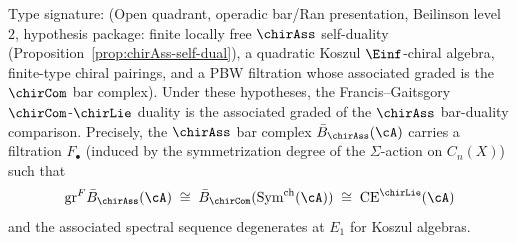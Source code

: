 \begin{theorem}\label{thm:fg-from-assch}
Type signature: \textup{(}Open quadrant, operadic bar/Ran
presentation, Beilinson level~$2$, hypothesis package: finite locally
free $\chirAss$ self-duality
\textup{(}Proposition~\ref{prop:chirAss-self-dual}\textup{)}, a
quadratic Koszul $\Einf$-chiral algebra, finite-type chiral pairings,
and a PBW filtration whose associated graded is the
$\chirCom$ bar complex\textup{)}.
Under these hypotheses, the Francis--Gaitsgory
$\chirCom$-$\chirLie$ duality is the associated graded of the
$\chirAss$ bar-duality comparison. Precisely, the $\chirAss$ bar
complex $\bar{B}_{\chirAss}(\cA)$ carries a filtration $F_\bullet$
\textup{(}induced by the symmetrization degree of the
$\Sigma$-action on $C_n(X)$\textup{)} such that
\begin{equation}\label{eq:fg-from-assch}
\mathrm{gr}^F \bar{B}_{\chirAss}(\cA) \;\cong\; \bar{B}_{\chirCom}(\mathrm{Sym}^{\mathrm{ch}}(\cA)) \;\cong\; \mathrm{CE}^{\chirLie}(\cA)
\end{equation}
and the associated spectral sequence degenerates at $E_1$ for Koszul algebras.
\end{theorem}

